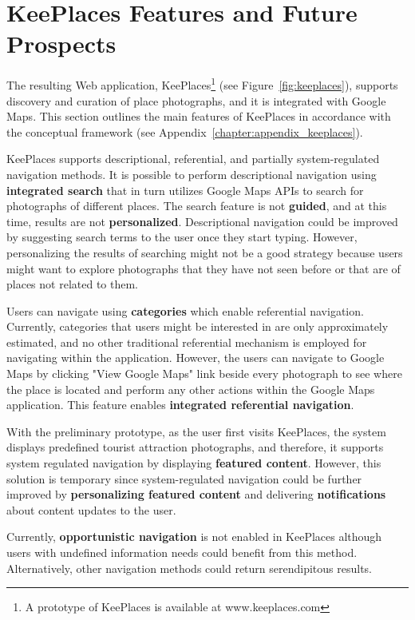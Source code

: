 {\section{KeePlaces Features and Future Prospects}
The resulting Web application, KeePlaces\footnote[1]{A prototype of KeePlaces is available at www.keeplaces.com} (see Figure~\ref{fig:keeplaces}), supports discovery and curation of place photographs, and it is integrated with Google Maps. This section outlines the main features of KeePlaces in accordance with the conceptual framework (see Appendix~\ref{chapter:appendix_keeplaces}). 

KeePlaces supports descriptional, referential, and partially system-regulated navigation methods. It is possible to perform descriptional navigation using \textbf{integrated search} that in turn utilizes Google Maps APIs to search for photographs of different places. The search feature is not \textbf{guided}, and at this time, results are not \textbf{personalized}. Descriptional navigation could be improved by suggesting search terms to the user once they start typing. However, personalizing the results of searching might not be a good strategy because users might want to explore photographs that they have not seen before or that are of places not related to them. 

Users can navigate using \textbf{categories} which enable referential navigation. Currently, categories that users might be interested in are only approximately estimated, and no other traditional referential mechanism is employed for navigating within the application. However, the users can navigate to Google Maps by clicking "View Google Maps" link beside every photograph to see where the place is located and perform any other actions within the Google Maps application. This feature enables \textbf{integrated referential navigation}. 

With the preliminary prototype, as the user first visits KeePlaces, the system displays predefined tourist attraction photographs, and therefore, it supports system regulated navigation by displaying \textbf{featured content}. However, this solution is temporary since system-regulated navigation could be further improved by \textbf{personalizing featured content} and delivering \textbf{notifications} about content updates to the user. 

Currently, \textbf{opportunistic navigation} is not enabled in KeePlaces although users with undefined information needs could benefit from this method. Alternatively, other navigation methods could return serendipitous results.

}
